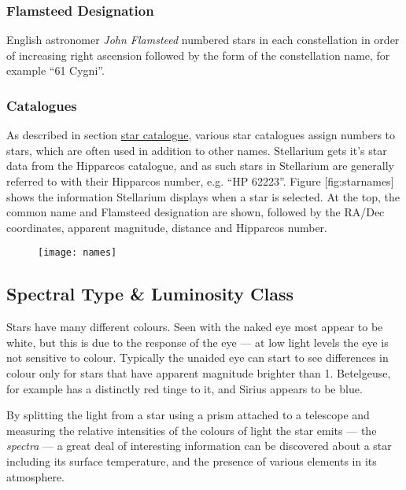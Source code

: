 \subsubsection{Flamsteed Designation}\label{flamsteed-designation}

English astronomer \emph{John Flamsteed} numbered stars in each
constellation in order of increasing right ascension followed by the
form of the constellation name, for example ``61 Cygni''.

\subsubsection{Catalogues}\label{catalogues}

As described in section \href{Star_Catalogue}{star catalogue}, various
star catalogues assign numbers to stars, which are often used in
addition to other names. Stellarium gets it's star data from the
Hipparcos catalogue, and as such stars in Stellarium are generally
referred to with their Hipparcos number, e.g. ``HP 62223''. Figure
{[}fig:starnames{]} shows the information Stellarium displays when a
star is selected. At the top, the common name and Flamsteed designation
are shown, followed by the RA/Dec coordinates, apparent magnitude,
distance and Hipparcos number.

\begin{figure}[h]
\centering\texttt{[image: names]}
\end{figure}

\subsection{Spectral Type \& Luminosity
Class}\label{spectral-type-luminosity-class}

Stars have many different colours. Seen with the naked eye most appear
to be white, but this is due to the response of the eye --- at low light
levels the eye is not sensitive to colour. Typically the unaided eye can
start to see differences in colour only for stars that have apparent
magnitude brighter than 1. Betelgeuse, for example has a distinctly red
tinge to it, and Sirius appears to be blue.

By splitting the light from a star using a prism attached to a telescope
and measuring the relative intensities of the colours of light the star
emits --- the \emph{spectra} --- a great deal of interesting information
can be discovered about a star including its surface temperature, and
the presence of various elements in its atmosphere.

